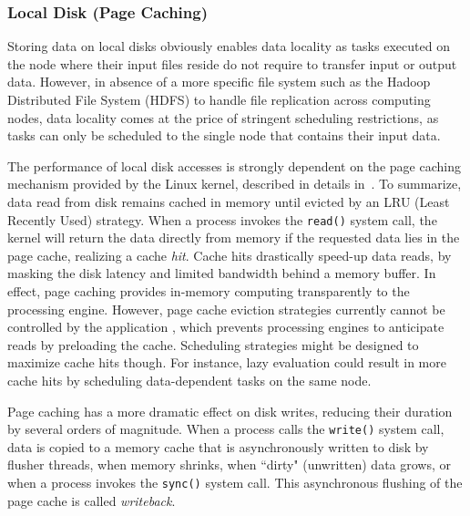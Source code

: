 \documentclass{IEEEtran}
\newcommand{\todo}[1]{\marginpar{\parbox{18mm}{\flushleft\tiny\color{red}\textbf{TODO}:
      #1}}}
\begin{document}
\subsubsection{Local Disk (Page Caching)} %





Storing data on local disks obviously enables data locality as tasks 
executed on the node where their input files reside do not require to 
transfer input or output data. However, in absence of a more specific 
file system such as the Hadoop Distributed File System (HDFS) to handle 
file replication across computing nodes, data locality comes at the price
of stringent scheduling restrictions, as tasks can only be scheduled to the
single node that contains their input data.

The performance of local disk accesses is strongly dependent on the 
page caching mechanism provided by the Linux kernel, described in    
details in~\cite{love2010linux}. To summarize, data read from disk 
remains cached in memory until evicted by an LRU (Least Recently Used) 
strategy. When a process invokes the \texttt{read()} system call, the 
kernel will return the data directly from memory if the requested data 
lies in the page cache, realizing a cache \emph{hit}. Cache hits drastically speed-up data 
reads, by masking the disk latency and limited bandwidth behind a 
memory buffer. In effect, page caching provides in-memory computing 
transparently to the processing engine. However, page cache eviction 
strategies currently cannot be controlled by the application 
\todo{check that}, which prevents processing engines to anticipate 
reads by preloading the cache. Scheduling strategies might be designed 
to maximize cache hits though. For instance, lazy 
evaluation could result in more cache hits by scheduling data-dependent 
tasks on the same node.

Page caching has a more dramatic effect on disk writes, reducing their 
duration by several orders of magnitude. When a process calls the 
\texttt{write()} system call, data is copied to a memory cache that is 
asynchronously written to disk by flusher threads, when memory shrinks, when
``dirty" (unwritten) data grows, or when a 
process invokes the \texttt{sync()} system call. 
This asynchronous flushing of the page cache is called 
\emph{writeback}.
\end{document}
